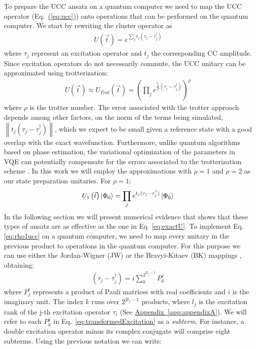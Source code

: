 \documentclass[superscriptaddress,aps,pra,twocolumn,nofootinbib,babel]{revtex4-1}
\newcommand{\eq}[1]{Eq.~\hyperref[eq:#1]{(\ref*{eq:#1})}}
\newcommand{\app}[1]{\hyperref[app:#1]{Appendix~\ref*{app:#1}}}
\def\ket#1{\mathinner{|{#1}\rangle}}
\begin{document}
To prepare the UCC ansatz on a quantum computer we need to map the UCC operator (\eq{ucc}) onto operations that can be performed on the quantum computer. We start by rewriting the cluster operator as 
\begin{align}\label{eq:exactU}
U(\vec{t})=e^{\sum_j t_j (\tau_j-\tau_j^{\dagger})}
\end{align}
where $\tau_j$ represent an excitation operator and $t_j$ the corresponding CC amplitude. Since excitation operators do not necessarily commute, the UCC unitary can be approximated using trotterization:
\begin{align}\label{eq:trotterU}
U\left(\vec{t}\right) \approx U_{Trot}\left( \vec{t} \right) = \left( \prod_j e^{\frac{t_j}{\rho}(\tau_j-\tau_j^{\dagger})} \right) ^{\rho}
\end{align}
where $\rho$ is the trotter number. The error associated with the trotter approach depends among other factors, on the norm of the terms being simulated, $\left\| t_j(\tau_j-\tau_j^{\dagger}) \right\|$, which we expect to be small given a reference state with a good overlap with the exact wavefunction. Furthermore, unlike quantum algorithms based on phase estimation, the variational optimization of the parameters in VQE can potentially compensate for the errors associated to the trotterization scheme \cite{Wecker.PRA.92.042303.2015}. In this work we will employ the approximations with $\rho=1$ and $\rho=2$ as our state preparation unitaries. For $\rho=1$:
\begin{align}\label{eq:rho1ucc}
U_{1}\left(\vec{t}\right) \ket{\Phi_{0}} = \prod_j e^{t_j(\tau_j-\tau_j^{\dagger})} \ket{\Phi_{0}}
\end{align}
In the following section we will present numerical evidence that shows that these types of ansatz are as effective as the one in Eq. \ref{eq:exactU}. To implement Eq. \ref{eq:rho1ucc} on a quantum computer, we need to map every unitary in the previous product to operations in the quantum computer. For this purpose we can use either the Jordan-Wigner (JW) or the Bravyi-Kitaev (BK) mappings \cite{jordan.ZP.47.631.1928,Seeley.JCP.137.224109.2012,Tranter.115.1431.IJQC.2015}, obtaining:
\begin{align}\label{eq:transformedExcitation}
(\tau_j-\tau_j^{\dagger})=i\sum^{2^{2l_j-1}}_k P^j_k
\end{align}
where $P^i_j$ represents a product of Pauli matrices with real coefficients and $i$ is the imaginary unit. The index $k$ runs over $2^{2l_j-1}$ products, where $l_j$ is the excitation rank of the j-th excitation operator $\tau_i$ (See \app{appendixA}). We will refer to each $P^j_k$ in Eq.~\ref{eq:transformedExcitation} as a \textit{subterm}. For instance, a double excitation operator minus its complex conjugate will comprise eight subterms. Using the previous notation we can write:
\end{document}
